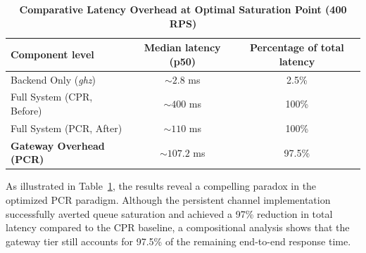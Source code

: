 \documentclass{ieeeaccess}
\begin{document}

\begin{table}[htbp]
\centering
\caption{\textbf{Comparative Latency Overhead at Optimal Saturation Point (400 RPS)}}
\label{table1}
\setlength{\tabcolsep}{3pt}
\begin{tabular}{lcc}
\hline
\textbf{Component level}& \textbf{Median latency (p50)}& \textbf{Percentage of total latency}\\
\hline
Backend Only (\textit{ghz}) & $\sim 2.8$ ms & 2.5\% \\
Full System (CPR, Before) & $\sim 400$ ms & 100\% \\
Full System (PCR, After) & $\sim 110$ ms & 100\% \\
\hline
\textbf{Gateway Overhead (PCR)} & $\sim 107.2$ ms & 97.5\% \\ 
\hline
\end{tabular}
\end{table}
    
As illustrated in Table~\ref{table1}, the results reveal a compelling paradox in the optimized PCR paradigm. Although the persistent channel implementation successfully averted queue saturation and achieved a 97\% reduction in total latency compared to the CPR baseline, a compositional analysis shows that the gateway tier still accounts for 97.5\% of the remaining end-to-end response time. 
\end{document}
